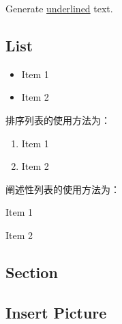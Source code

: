 \documentclass[a4paper, 12pt]{article}
\begin{document}
Generate \underline{underlined} text. \\     %





\subsection{List}

\begin{itemize}

    \item Item 1 %
    \item Item 2 %
    
    \end{itemize}
    排序列表的使用方法为：
    \begin{enumerate}
    
    \item Item 1 %
    \item Item 2 %
    
    \end{enumerate}
    阐述性列表的使用方法为：
    \begin{description}
    
    \item Item 1 %
    \item Item 2 %
    
    \end{description}


\subsection{Section}





\subsection{Insert Picture}
\end{document}

